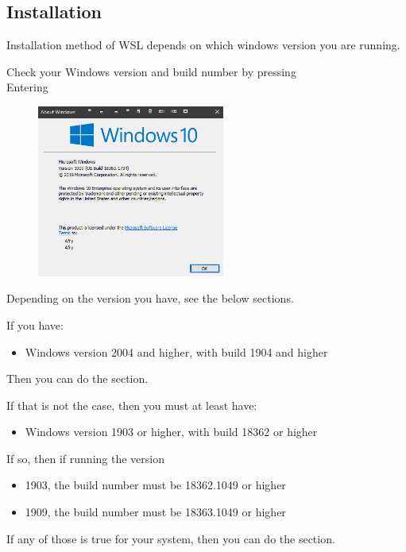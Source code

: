 \subsection{Installation}

Installation method of WSL depends on which windows version you are running.

Check your Windows version and build number by pressing\\
 \ra Entering 

\begin{figure}[H]
    \includegraphics[width=0.55\textwidth]{figures/windows_version.PNG}
\end{figure}

Depending on the version you have, see the below sections.

If you have:
\begin{itemize}
    \item Windows version 2004 and higher, with build 1904 and higher
\end{itemize}
Then you can do the  section.

If that is not the case, then you must at least have:
\begin{itemize}
    \item Windows version 1903 or higher, with build 18362 or higher
\end{itemize}

If so, then if running the version
\begin{itemize}
    \item 1903, the build number must be 18362.1049 or higher
    \item 1909, the build number must be 18363.1049 or higher
\end{itemize}

If any of those is true for your system, then you can do the  section.



